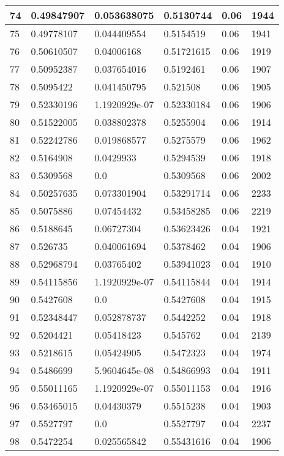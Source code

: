 \begin{longtable}{|l|l|l|l|l|l|}
74 & 0.49847907 & 0.053638075 & 0.5130744 & 0.06 & 1944 \\ \hline 
75 & 0.49778107 & 0.044409554 & 0.5154519 & 0.06 & 1941 \\ \hline 
76 & 0.50610507 & 0.04006168 & 0.51721615 & 0.06 & 1919 \\ \hline 
77 & 0.50952387 & 0.037654016 & 0.5192461 & 0.06 & 1907 \\ \hline 
78 & 0.5095422 & 0.041450795 & 0.521508 & 0.06 & 1905 \\ \hline 
79 & 0.52330196 & 1.1920929e-07 & 0.52330184 & 0.06 & 1906 \\ \hline 
80 & 0.51522005 & 0.038802378 & 0.5255904 & 0.06 & 1914 \\ \hline 
81 & 0.52242786 & 0.019868577 & 0.5275579 & 0.06 & 1962 \\ \hline 
82 & 0.5164908 & 0.0429933 & 0.5294539 & 0.06 & 1918 \\ \hline 
83 & 0.5309568 & 0.0 & 0.5309568 & 0.06 & 2002 \\ \hline 
84 & 0.50257635 & 0.073301904 & 0.53291714 & 0.06 & 2233 \\ \hline 
85 & 0.5075886 & 0.07454432 & 0.53458285 & 0.06 & 2219 \\ \hline 
86 & 0.5188645 & 0.06727304 & 0.53623426 & 0.04 & 1921 \\ \hline 
87 & 0.526735 & 0.040061694 & 0.5378462 & 0.04 & 1906 \\ \hline 
88 & 0.52968794 & 0.03765402 & 0.53941023 & 0.04 & 1910 \\ \hline 
89 & 0.54115856 & 1.1920929e-07 & 0.54115844 & 0.04 & 1914 \\ \hline 
90 & 0.5427608 & 0.0 & 0.5427608 & 0.04 & 1915 \\ \hline 
91 & 0.52348447 & 0.052878737 & 0.5442252 & 0.04 & 1918 \\ \hline 
92 & 0.5204421 & 0.05418423 & 0.545762 & 0.04 & 2139 \\ \hline 
93 & 0.5218615 & 0.05424905 & 0.5472323 & 0.04 & 1974 \\ \hline 
94 & 0.5486699 & 5.9604645e-08 & 0.54866993 & 0.04 & 1911 \\ \hline 
95 & 0.55011165 & 1.1920929e-07 & 0.55011153 & 0.04 & 1916 \\ \hline 
96 & 0.53465015 & 0.04430379 & 0.5515238 & 0.04 & 1903 \\ \hline 
97 & 0.5527797 & 0.0 & 0.5527797 & 0.04 & 2237 \\ \hline 
98 & 0.5472254 & 0.025565842 & 0.55431616 & 0.04 & 1906 \\ \hline 

\end{longtable}
